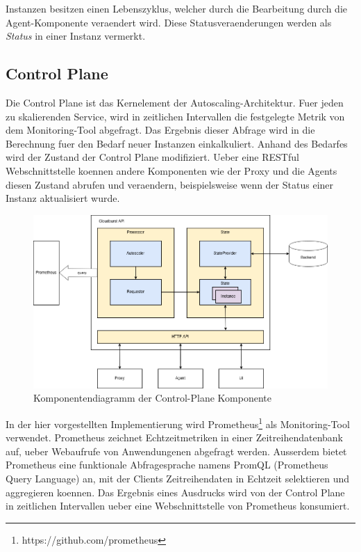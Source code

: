 \documentclass[runningheads]{llncs}
\begin{document}
Instanzen besitzen einen Lebenszyklus, welcher durch die Bearbeitung durch die Agent-Komponente veraendert wird. Diese Statusveraenderungen werden als \textit{Status} in einer Instanz vermerkt.
	
\subsection{Control Plane} \label{control_plane}

Die Control Plane ist das Kernelement der Autoscaling-Architektur. Fuer jeden zu skalierenden Service, wird in zeitlichen Intervallen die festgelegte Metrik von dem Monitoring-Tool abgefragt. Das Ergebnis dieser Abfrage wird in die Berechnung fuer den Bedarf neuer Instanzen einkalkuliert. Anhand des Bedarfes wird der Zustand der Control Plane modifiziert. Ueber eine RESTful Webschnittstelle koennen andere Komponenten wie der Proxy und die Agents diesen Zustand abrufen und veraendern, beispielsweise wenn der Status einer Instanz aktualisiert wurde.

\begin{figure}[h]
	\centering
	\includegraphics[width=1.0\linewidth,scale=1.0]{images/autoscaler.png}
	\caption{Komponentendiagramm der Control-Plane Komponente}
\end{figure}

In der hier vorgestellten Implementierung wird Prometheus\footnote{https://github.com/prometheus} als Monitoring-Tool verwendet.  Prometheus zeichnet Echtzeitmetriken in einer Zeitreihendatenbank auf, ueber Webaufrufe von Anwendungenen abgefragt werden. Ausserdem bietet Prometheus eine funktionale Abfragesprache namens PromQL (Prometheus Query Language) an, mit der Clients Zeitreihendaten in Echtzeit selektieren und aggregieren koennen. Das Ergebnis eines Ausdrucks wird von der Control Plane in zeitlichen Intervallen ueber eine Webschnittstelle von Prometheus konsumiert. \\
\end{document}
